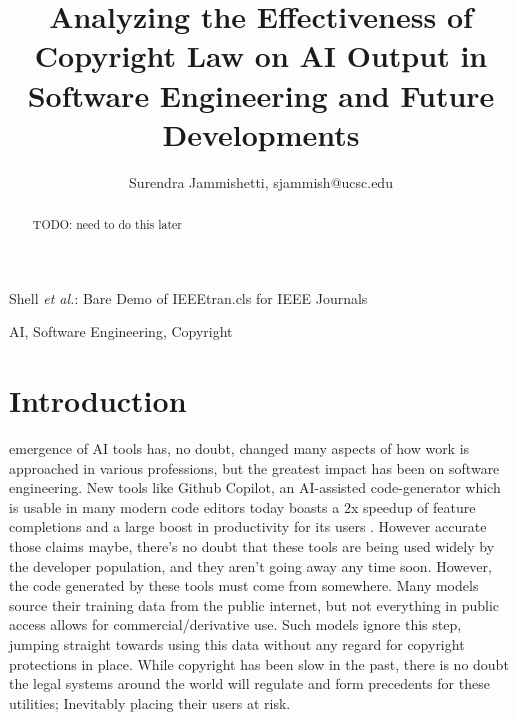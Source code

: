 \documentclass[journal]{IEEEtran}
\begin{document}
\title{Analyzing the Effectiveness of Copyright Law on AI Output in Software
Engineering and Future Developments}

\author{Surendra Jammishetti, sjammish@ucsc.edu}%
        
{Shell \MakeLowercase{\textit{et al.}}: Bare Demo of IEEEtran.cls for IEEE Journals}

\maketitle

\begin{abstract}
TODO: need to do this later
\end{abstract}

\begin{IEEEkeywords}
AI, Software Engineering, Copyright
\end{IEEEkeywords}

\section{Introduction}
%
% 

 emergence of AI tools has, no doubt, changed many
aspects of how work is approached in various professions,
but the greatest impact has been on software engineering.
New tools like Github Copilot, an AI-assisted code-generator
which is usable in many modern code editors today boasts
a 2x speedup of feature completions and a large boost in
productivity for its users \cite{github}. However accurate those claims
maybe, there's no doubt that these tools are being used widely
by the developer population, and they aren't going away any
time soon.
However, the code generated by these tools must come from
somewhere. Many models source their training data from the
public internet, but not everything in public access allows for
commercial/derivative use. Such models ignore this step,
jumping straight towards using this data without any regard
for copyright protections in place. While copyright has been
slow in the past, there is no doubt the legal systems around
the world will regulate and form precedents for these utilities;
Inevitably placing their users at risk.
\end{document}
